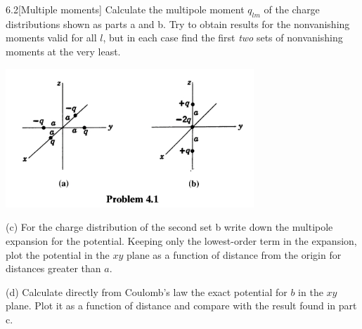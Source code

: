 \documentclass[12pt]{article}
\begin{document}
\begin{problem}{6.2}[Multiple moments]
Calculate the multipole moment $q_{lm}$ of the charge distributions shown as
parts a and b. Try to obtain results for the nonvanishing moments valid for all
$l$, but in each case find the first \textit{two} sets of nonvanishing moments
at the very least.
\begin{center}
    \includegraphics[width=0.7\textwidth]{hw6_p2.jpg} 
\end{center}

(c) For the charge distribution of the second set b write down the multipole
expansion for the potential. Keeping only the lowest-order term in the
expansion, plot the potential in the $xy$ plane as a function of distance from
the origin for distances greater than $a$.

(d) Calculate directly from Coulomb's law the exact potential for $b$ in the
$xy$ plane. Plot it as a function of distance and compare with the result found
in part c.


\end{problem}
\end{document}
